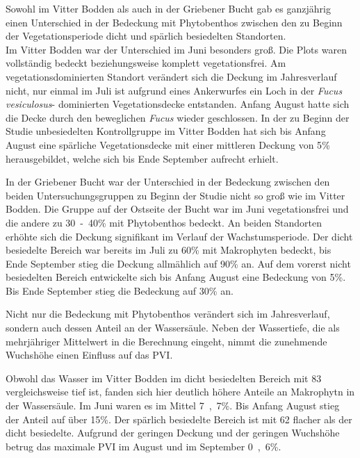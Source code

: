 Sowohl im Vitter Bodden als auch in der Griebener Bucht gab es ganzjährig einen Unterschied in der Bedeckung mit Phytobenthos zwischen den zu Beginn der Vegetationsperiode dicht und spärlich besiedelten Standorten.\\
Im Vitter Bodden war der Unterschied im Juni besonders groß. Die Plots waren vollständig bedeckt beziehungsweise komplett vegetationsfrei. Am vegetationsdominierten Standort verändert sich die Deckung im Jahresverlauf nicht, nur einmal im Juli ist aufgrund eines Ankerwurfes ein Loch in der \textit{Fucus vesiculosus}- dominierten Vegetationsdecke entstanden. Anfang August hatte sich die Decke durch den beweglichen \textit{Fucus} wieder geschlossen.
In der zu Beginn der Studie unbesiedelten Kontrollgruppe im Vitter Bodden hat sich bis Anfang August eine spärliche Vegetationsdecke mit einer mittleren Deckung von \unit{5}{\%} herausgebildet, welche sich bis Ende September aufrecht erhielt.

In der Griebener Bucht war der Unterschied in der Bedeckung zwischen den beiden Untersuchungsgruppen zu Beginn der Studie nicht so groß wie im Vitter Bodden. Die Gruppe auf der Ostseite der Bucht war im Juni vegetationsfrei und die andere zu \unit{30-40}{\%} mit Phytobenthos bedeckt. An beiden Standorten erhöhte sich die Deckung signifikant im Verlauf der Wachstumsperiode. Der dicht besiedelte Bereich war bereits im Juli zu \unit{60}{\%} mit Makrophyten bedeckt, bis Ende September stieg die Deckung allmählich auf \unit{90}{\%} an. Auf dem vorerst nicht besiedelten Bereich entwickelte sich bis Anfang August eine Bedeckung von \unit{5}{\%}. Bis Ende September stieg die Bedeckung auf \unit{30}{\%} an.

Nicht nur die Bedeckung mit Phytobenthos verändert sich im Jahresverlauf, sondern auch dessen Anteil an der Wassersäule. Neben der Wassertiefe, die als mehrjähriger Mittelwert in die Berechnung eingeht, nimmt die zunehmende Wuchshöhe einen Einfluss auf das PVI.

Obwohl das Wasser im Vitter Bodden im dicht besiedelten Bereich mit \unit{83}{\centi\metre} vergleichsweise tief ist, fanden sich hier deutlich höhere Anteile an Makrophytn in der Wassersäule. Im Juni waren es im Mittel \unit{7,7}{\%}. Bis Anfang August stieg der Anteil auf über \unit{15}{\%}. Der spärlich besiedelte Bereich ist mit \unit{62}{\centi\metre} flacher als der dicht besiedelte. Aufgrund der geringen Deckung und der geringen Wuchshöhe betrug das maximale PVI im August und im September \unit{0,6}{\%}. 


